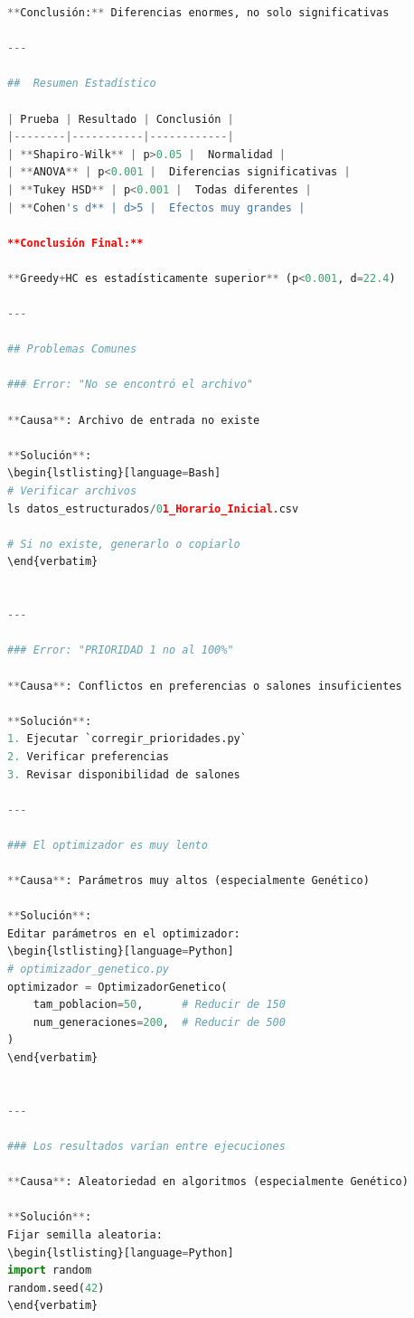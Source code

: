 \begin{itemize}
\begin{itemize}
\begin{itemize}
\begin{itemize}
\begin{itemize}
\begin{itemize}
\begin{enumerate}
\begin{enumerate}
\begin{enumerate}
\begin{enumerate}
\begin{lstlisting}[language=Python]
**Conclusión:** Diferencias enormes, no solo significativas 

---

##  Resumen Estadístico

| Prueba | Resultado | Conclusión |
|--------|-----------|------------|
| **Shapiro-Wilk** | p>0.05 |  Normalidad |
| **ANOVA** | p<0.001 |  Diferencias significativas |
| **Tukey HSD** | p<0.001 |  Todas diferentes |
| **Cohen's d** | d>5 |  Efectos muy grandes |

**Conclusión Final:**

**Greedy+HC es estadísticamente superior** (p<0.001, d=22.4)

---

## Problemas Comunes

### Error: "No se encontró el archivo"

**Causa**: Archivo de entrada no existe

**Solución**:
\begin{lstlisting}[language=Bash]
# Verificar archivos
ls datos_estructurados/01_Horario_Inicial.csv

# Si no existe, generarlo o copiarlo
\end{verbatim}


---

### Error: "PRIORIDAD 1 no al 100%"

**Causa**: Conflictos en preferencias o salones insuficientes

**Solución**:
1. Ejecutar `corregir_prioridades.py`
2. Verificar preferencias
3. Revisar disponibilidad de salones

---

### El optimizador es muy lento

**Causa**: Parámetros muy altos (especialmente Genético)

**Solución**:
Editar parámetros en el optimizador:
\begin{lstlisting}[language=Python]
# optimizador_genetico.py
optimizador = OptimizadorGenetico(
    tam_poblacion=50,      # Reducir de 150
    num_generaciones=200,  # Reducir de 500
)
\end{verbatim}


---

### Los resultados varían entre ejecuciones

**Causa**: Aleatoriedad en algoritmos (especialmente Genético)

**Solución**:
Fijar semilla aleatoria:
\begin{lstlisting}[language=Python]
import random
random.seed(42)
\end{verbatim}




\end{lstlisting}
\end{enumerate}
\end{enumerate}
\end{enumerate}
\end{enumerate}
\end{itemize}
\end{itemize}
\end{itemize}
\end{itemize}
\end{itemize}
\end{itemize}
